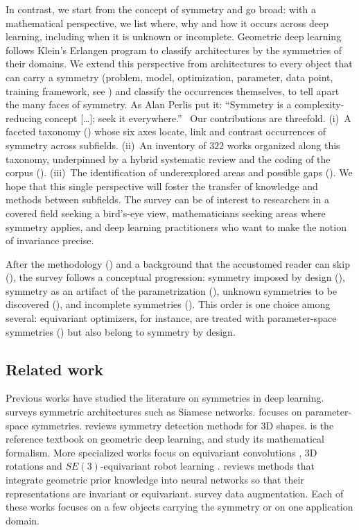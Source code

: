 \documentclass[mathematics,review,submit,moreauthors]{Definitions/mdpi}
\begin{document}
In contrast, we start from the concept of symmetry and go broad: with a mathematical perspective, we list where, why and how it occurs across deep learning, including when it is unknown or incomplete.
Geometric deep learning~\citep{bronstein2021} follows Klein's Erlangen program to classify architectures by the symmetries of their domains.
We extend this perspective from architectures to every object that can carry a symmetry (problem, model, optimization, parameter, data point, training framework, see ) and classify the occurrences themselves, to tell apart the many faces of symmetry.
As Alan Perlis put it: ``Symmetry is a complexity-reducing concept […]; seek it everywhere.''~\citep{perlis1982}
Our contributions are threefold.
(i)~A faceted taxonomy () whose six axes locate, link and contrast occurrences of symmetry across subfields.
(ii)~An inventory of $322$ works organized along this taxonomy, underpinned by a hybrid systematic review and the coding of the corpus ().
(iii)~The identification of underexplored areas and possible gaps ().
We hope that this single perspective will foster the transfer of knowledge and methods between subfields.
The survey can be of interest to researchers in a covered field seeking a bird's-eye view, mathematicians seeking areas where symmetry applies, and deep learning practitioners who want to make the notion of invariance precise.

After the methodology () and a background that the accustomed reader can skip (), the survey follows a conceptual progression: symmetry imposed by design (), symmetry as an artifact of the parametrization (), unknown symmetries to be discovered (), and incomplete symmetries ().
This order is one choice among several: equivariant optimizers, for instance, are treated with parameter-space symmetries () but also belong to symmetry by design.

\subsection{Related work}\label{sec:related-work}
Previous works have studied the literature on symmetries in deep learning.
\citet{ilina2022sa} surveys symmetric architectures such as Siamese networks.
\citet{zhao2025} focuses on parameter-space symmetries.
\citet{sipiran202523scgpis} reviews symmetry detection methods for 3D shapes.
\citet{bronstein2021} is the reference textbook on geometric deep learning, and \citet{gerken2021,carlsson2025} study its mathematical formalism.
More specialized works focus on equivariant convolutions \citep{basheer2025ijdsa,habte2023}, 3D rotations \citep{fei2024air} and $SE(3)$-equivariant robot learning \citep{seo2025a}.
\citet{rath2024air} reviews methods that integrate geometric prior knowledge into neural networks so that their representations are invariant or equivariant.
\citet{shorten2019jbd,mumuni2022a} survey data augmentation.
Each of these works focuses on a few objects carrying the symmetry or on one application domain.
\end{document}
